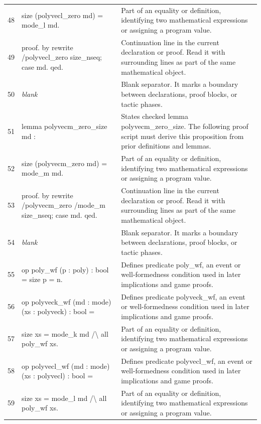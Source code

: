 \documentclass[10pt]{article}
\begin{document}
\begin{longtable}{r L{0.53\textwidth} L{0.37\textwidth}}
48 & {\ttfamily\scriptsize   size (polyvecl\_zero md) = mode\_l md.} & Part of an equality or definition, identifying two mathematical expressions or assigning a program value. \\
49 & {\ttfamily\scriptsize proof. by rewrite /polyvecl\_zero size\_nseq; case md. qed.} & Continuation line in the current declaration or proof.  Read it with surrounding lines as part of the same mathematical object. \\
50 & {\ttfamily\scriptsize \emph{blank}} & Blank separator.  It marks a boundary between declarations, proof blocks, or tactic phases. \\
51 & {\ttfamily\scriptsize lemma polyvecm\_zero\_size md :} & States checked lemma polyvecm\_zero\_size.  The following proof script must derive this proposition from prior definitions and lemmas. \\
52 & {\ttfamily\scriptsize   size (polyvecm\_zero md) = mode\_m md.} & Part of an equality or definition, identifying two mathematical expressions or assigning a program value. \\
53 & {\ttfamily\scriptsize proof. by rewrite /polyvecm\_zero /mode\_m size\_nseq; case md. qed.} & Continuation line in the current declaration or proof.  Read it with surrounding lines as part of the same mathematical object. \\
54 & {\ttfamily\scriptsize \emph{blank}} & Blank separator.  It marks a boundary between declarations, proof blocks, or tactic phases. \\
55 & {\ttfamily\scriptsize op poly\_wf (p : poly) : bool = size p = n.} & Defines predicate poly\_wf, an event or well-formedness condition used in later implications and game proofs. \\
56 & {\ttfamily\scriptsize op polyveck\_wf (md : mode) (xs : polyveck) : bool =} & Defines predicate polyveck\_wf, an event or well-formedness condition used in later implications and game proofs. \\
57 & {\ttfamily\scriptsize   size xs = mode\_k md /\textbackslash{} all poly\_wf xs.} & Part of an equality or definition, identifying two mathematical expressions or assigning a program value. \\
58 & {\ttfamily\scriptsize op polyvecl\_wf (md : mode) (xs : polyvecl) : bool =} & Defines predicate polyvecl\_wf, an event or well-formedness condition used in later implications and game proofs. \\
59 & {\ttfamily\scriptsize   size xs = mode\_l md /\textbackslash{} all poly\_wf xs.} & Part of an equality or definition, identifying two mathematical expressions or assigning a program value. \\

\end{longtable}
\end{document}
